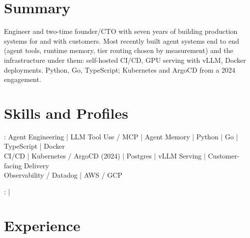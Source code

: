 \documentclass[print]{jack-resume}
\begin{document}
\pagecolor{darkmodeBackground}


\begin{minipage}[t][1cm][t]{.03\textwidth}
    \hfill
\end{minipage}

\section{Summary}
Engineer and two-time founder/CTO with seven years of building production systems for and with customers. Most recently built agent systems end to end (agent tools, runtime memory, tier routing chosen by measurement) and the infrastructure under them: self-hosted CI/CD, GPU serving with vLLM, Docker deployments. Python, Go, TypeScript; Kubernetes and ArgoCD from a 2024 engagement.
\sectionsep

\section{Skills and Profiles}
:
Agent Engineering \hfill | \hfill
LLM Tool Use / MCP \hfill | \hfill
Agent Memory \hfill | \hfill
Python \hfill | \hfill
Go \hfill | \hfill
TypeScript \hfill | \hfill
Docker \\
\hspace{1.0cm} CI/CD \hfill | \hfill
Kubernetes / ArgoCD (2024) \hfill | \hfill
Postgres \hfill | \hfill
vLLM Serving \hfill | \hfill
Customer-facing Delivery \\
\hspace{1.0cm} Observability / Datadog \hfill | \hfill
AWS / GCP \\

\raggedright{
    :
      \href{https://www.linkedin.com/in/jack-sturtevant/}{ \ExternalLink} |
     \href{https://github.com/jacksturt}{ \ExternalLink}}

\section{Experience}
\end{document}
